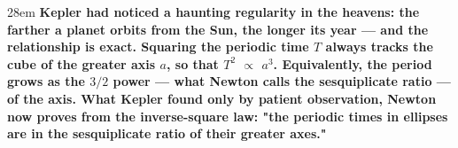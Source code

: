 \documentclass[border=4pt]{standalone}
\begin{document}
\begin{varwidth}{28em}
\large\bfseries
Kepler had noticed a haunting regularity in the heavens: the farther a planet      orbits from the Sun, the longer its year — and the relationship is exact. Squaring      the periodic time $T$ always tracks the cube of the greater axis $a$,      so that $T^2$ $\propto$ $a^3$. Equivalently, the period      grows as the $3/2$ power — what Newton calls the sesquiplicate ratio —      of the axis. What Kepler found only by patient observation, Newton now proves from      the inverse-square law: "the periodic times in ellipses are in the sesquiplicate ratio of their greater axes."
\end{varwidth}
\end{document}
